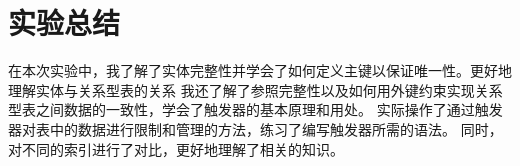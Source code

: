 \documentclass[a4paper,twoside]{article}
\begin{document}
\begin{spacing}{1.2}
\begin{enumerate}
\end{enumerate}

\section{实验总结}

在本次实验中，我了解了实体完整性并学会了如何定义主键以保证唯一性。更好地理解实体与关系型表的关系
我还了解了参照完整性以及如何用外键约束实现关系型表之间数据的一致性，学会了触发器的基本原理和用处。
实际操作了通过触发器对表中的数据进行限制和管理的方法，练习了编写触发器所需的语法。
同时，对不同的索引进行了对比，更好地理解了相关的知识。

\end{spacing}
\end{document}
